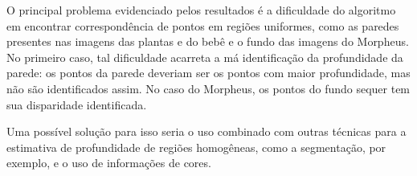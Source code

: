 \documentclass{bmvc2k}
\begin{document}
O principal problema evidenciado pelos resultados é a dificuldade do algoritmo em encontrar correspondência de pontos em regiões uniformes, como as paredes presentes nas imagens das plantas e do bebê e o fundo das imagens do Morpheus. No primeiro caso, tal dificuldade acarreta a má identificação da profundidade da parede: os pontos da parede deveriam ser os pontos com maior profundidade, mas não são identificados assim. No caso do Morpheus, os pontos do fundo sequer tem sua disparidade identificada.

Uma possível solução para isso seria o uso combinado com outras técnicas para a estimativa de profundidade de regiões homogêneas, como a segmentação, por exemplo, e o uso de informações de cores.



\clearpage

\end{document}
